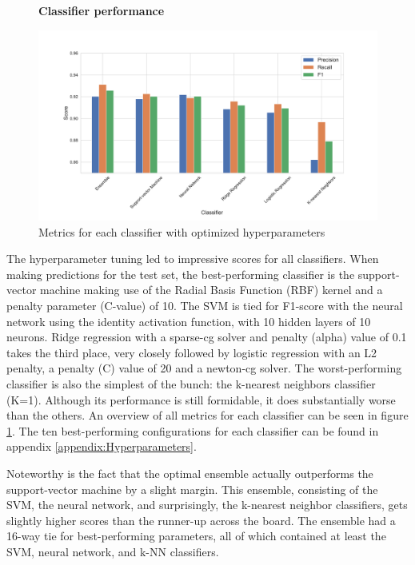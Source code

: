 \documentclass[../main.tex]{subfiles}
\begin{document}
\begin{figure}
  \textbf{Classifier performance}\par\medskip
  \centering
  \includegraphics[keepaspectratio, width=\textwidth]{images/classifier_results.pdf}
  \caption{Metrics for each classifier with optimized hyperparameters}
  \label{fig:ML_scores}
\end{figure}

The hyperparameter tuning led to impressive scores for all classifiers. When making predictions for the
test set, the best-performing classifier is the support-vector machine making use of the Radial Basis
Function (RBF) kernel and a penalty parameter (C-value) of 10. The SVM is tied for F1-score with the neural 
network using the identity activation function, with 10 hidden layers of 10 neurons. Ridge regression with a 
sparse-cg solver and penalty (alpha) value of 0.1 takes the third place, very closely followed by logistic 
regression with an L2 penalty, a penalty (C) value of 20 and a newton-cg solver. The worst-performing 
classifier is also the simplest of the bunch: the k-nearest neighbors classifier (K=1). Although its 
performance is still formidable, it does substantially worse than the others. An overview of all metrics for 
each classifier can be seen in figure \ref{fig:ML_scores}. The ten best-performing configurations for each
classifier can be found in appendix \ref{appendix:Hyperparameters}.

Noteworthy is the fact that the optimal ensemble actually outperforms the support-vector machine by a
slight margin. This ensemble, consisting of the SVM, the neural network, and surprisingly, the k-nearest
neighbor classifiers, gets slightly higher scores than the runner-up across the board. The ensemble had
a 16-way tie for best-performing parameters, all of which contained at least the SVM, neural network,
and k-NN classifiers. 
\end{document}
